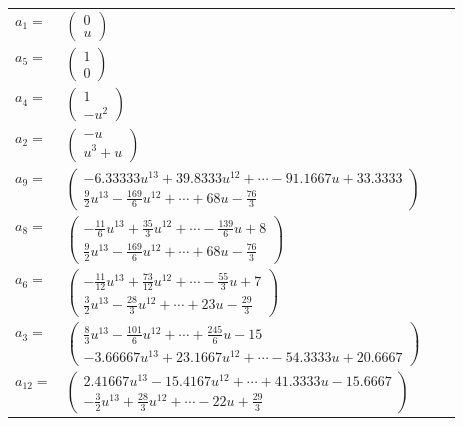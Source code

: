 \documentclass[1p]{elsarticle_modified}
\theoremstyle{definition}
\begin{document}
\begin{tabular}{m{7pt} m{180pt} m{7pt} m{180pt} }
\flushright $a_{1}=$&$\begin{pmatrix}0\\u\end{pmatrix}$ \\
\flushright $a_{5}=$&$\begin{pmatrix}1\\0\end{pmatrix}$ \\
\flushright $a_{4}=$&$\begin{pmatrix}1\\- u^2\end{pmatrix}$ \\
\flushright $a_{2}=$&$\begin{pmatrix}- u\\u^3+u\end{pmatrix}$ \\
\flushright $a_{9}=$&$\begin{pmatrix}-6.33333 u^{13}+39.8333 u^{12}+\cdots-91.1667 u+33.3333\\\frac{9}{2} u^{13}-\frac{169}{6} u^{12}+\cdots+68 u-\frac{76}{3}\end{pmatrix}$ \\
\flushright $a_{8}=$&$\begin{pmatrix}-\frac{11}{6} u^{13}+\frac{35}{3} u^{12}+\cdots-\frac{139}{6} u+8\\\frac{9}{2} u^{13}-\frac{169}{6} u^{12}+\cdots+68 u-\frac{76}{3}\end{pmatrix}$ \\
\flushright $a_{6}=$&$\begin{pmatrix}-\frac{11}{12} u^{13}+\frac{73}{12} u^{12}+\cdots-\frac{55}{3} u+7\\\frac{3}{2} u^{13}-\frac{28}{3} u^{12}+\cdots+23 u-\frac{29}{3}\end{pmatrix}$ \\
\flushright $a_{3}=$&$\begin{pmatrix}\frac{8}{3} u^{13}-\frac{101}{6} u^{12}+\cdots+\frac{245}{6} u-15\\-3.66667 u^{13}+23.1667 u^{12}+\cdots-54.3333 u+20.6667\end{pmatrix}$ \\
\flushright $a_{12}=$&$\begin{pmatrix}2.41667 u^{13}-15.4167 u^{12}+\cdots+41.3333 u-15.6667\\-\frac{3}{2} u^{13}+\frac{28}{3} u^{12}+\cdots-22 u+\frac{29}{3}\end{pmatrix}$ \\

\end{tabular}
\end{document}
